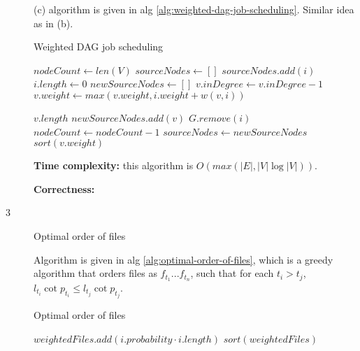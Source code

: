 \documentclass{article}
\begin{document}
\begin{description}
  (c) algorithm is given in alg \ref{alg:weighted-dag-job-scheduling}. Similar idea as in (b). 

  \begin{algorithm}[h]
  \caption{Weighted DAG job scheduling}
  \label{alg:weighted-dag-job-scheduling}
    \begin{algorithmic}[1]
  
      \State $nodeCount \gets len(V)$
      \State $sourceNodes \gets []$
          \State $sourceNodes.add(i)$
          \State $i.length \gets 0$
        \EndIf
      \EndFor
        \State $newSourceNodes \gets []$
            \State $v.inDegree \gets v.inDegree - 1$
            \State $v.weight \gets max(v.weight, i.weight + w(v,i))$
            
            \State $v.length$
              \State $newSourceNodes.add(v)$
            \EndIf
          \EndFor
          \State $G.remove(i)$
          \State $nodeCount \gets nodeCount - 1$
        \EndFor
        \State $sourceNodes \gets newSourceNodes$
      \EndWhile
      \State \Return $sort(v.weight)$
    \EndFunction
    
    \end{algorithmic}
  \end{algorithm}

  \textbf{Time complexity:} this algorithm is $O(max(|E|, |V| \log |V|))$.

  \textbf{Correctness:} 

\item[3]{Optimal order of files}
  
  Algorithm is given in alg \ref{alg:optimal-order-of-files}, which is a greedy algorithm that orders files as $f_{t_1}...f_{t_n}$, such that for each $t_i > t_j$, $l_{t_i} \cot p_{t_i} \leq l_{t_j} \cot p_{t_j}$.

  \begin{algorithm}[h]
  \caption{Optimal order of files}
  \label{alg:optimal-order-of-files}
    \begin{algorithmic}[1]
  
        \State $weightedFiles.add(i.probability \cdot i.length)$
      \EndFor
      \State \Return $sort(weightedFiles)$
    \EndFunction
    

\end{algorithmic}
\end{algorithm}
\end{description}
\end{document}
